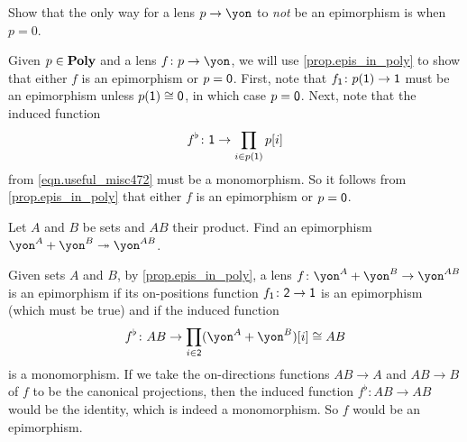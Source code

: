 \documentclass[Book-Poly]{subfiles}
\begin{document}

\begin{exercise}
Show that the only way for a lens $p\to\yon$ to \emph{not} be an epimorphism is when $p=0$.
\begin{solution}
Given $p \in \mathbf{Poly}$ and a lens $f \colon p \to \yon$, we will use \cref{prop.epis_in_poly} to show that either $f$ is an epimorphism or $p = \textsf{0}$.
First, note that $f_{\textsf{1}} \colon p(\textsf{1}) \to \textsf{1}$ must be an epimorphism unless $p(\textsf{1}) \cong \textsf{0}$, in which case $p = \textsf{0}$.
Next, note that the induced function
\[
    f^\flat \colon \textsf{1} \to \prod_{i\in p(\textsf{1})} p[i]
\]
from \eqref{eqn.useful_misc472} must be a monomorphism.
So it follows from \cref{prop.epis_in_poly} that either $f$ is an epimorphism or $p = \textsf{0}$.
\end{solution}
\end{exercise}

\begin{exercise}
Let $A$ and $B$ be sets and $AB$ their product. Find an epimorphism $\yon^A+\yon^B\surj\yon^{AB}$.
\begin{solution}
Given sets $A$ and $B$, by \cref{prop.epis_in_poly}, a lens $f \colon \yon^A + \yon^B \to \yon^{AB}$ is an epimorphism if its on-positions function $f_{\textsf{1}} \colon \textsf{2} \to \textsf{1}$ is an epimorphism (which must be true) and if the induced function
\[
    f^\flat \colon AB \to \prod_{i \in \2} (\yon^A + \yon^B)[i] \iso AB
\]
is a monomorphism.
If we take the on-directions functions $AB \to A$ and $AB \to B$ of $f$ to be the canonical projections, then the induced function $f^\flat \colon AB \to AB$ would be the identity, which is indeed a monomorphism.
So $f$ would be an epimorphism.
\end{solution}
\end{exercise}
\end{document}
